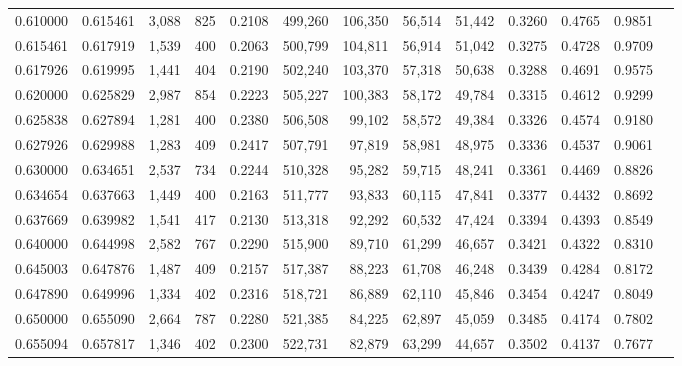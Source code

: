 \begin{tabular}{rrrrrrrrrrrrr}
0.610000 & 0.615461 &  3,088 &   825 &                                     0.2108 & 499,260 & 106,350 &  56,514 &  51,442 & 0.3260 & 0.4765 & 0.9851 \\
0.615461 & 0.617919 &  1,539 &   400 &                                     0.2063 & 500,799 & 104,811 &  56,914 &  51,042 & 0.3275 & 0.4728 & 0.9709 \\
0.617926 & 0.619995 &  1,441 &   404 &                                     0.2190 & 502,240 & 103,370 &  57,318 &  50,638 & 0.3288 & 0.4691 & 0.9575 \\
0.620000 & 0.625829 &  2,987 &   854 &                                     0.2223 & 505,227 & 100,383 &  58,172 &  49,784 & 0.3315 & 0.4612 & 0.9299 \\
0.625838 & 0.627894 &  1,281 &   400 &                                     0.2380 & 506,508 &  99,102 &  58,572 &  49,384 & 0.3326 & 0.4574 & 0.9180 \\
0.627926 & 0.629988 &  1,283 &   409 &                                     0.2417 & 507,791 &  97,819 &  58,981 &  48,975 & 0.3336 & 0.4537 & 0.9061 \\
0.630000 & 0.634651 &  2,537 &   734 &                                     0.2244 & 510,328 &  95,282 &  59,715 &  48,241 & 0.3361 & 0.4469 & 0.8826 \\
0.634654 & 0.637663 &  1,449 &   400 &                                     0.2163 & 511,777 &  93,833 &  60,115 &  47,841 & 0.3377 & 0.4432 & 0.8692 \\
0.637669 & 0.639982 &  1,541 &   417 &                                     0.2130 & 513,318 &  92,292 &  60,532 &  47,424 & 0.3394 & 0.4393 & 0.8549 \\
0.640000 & 0.644998 &  2,582 &   767 &                                     0.2290 & 515,900 &  89,710 &  61,299 &  46,657 & 0.3421 & 0.4322 & 0.8310 \\
0.645003 & 0.647876 &  1,487 &   409 &                                     0.2157 & 517,387 &  88,223 &  61,708 &  46,248 & 0.3439 & 0.4284 & 0.8172 \\
0.647890 & 0.649996 &  1,334 &   402 &                                     0.2316 & 518,721 &  86,889 &  62,110 &  45,846 & 0.3454 & 0.4247 & 0.8049 \\
0.650000 & 0.655090 &  2,664 &   787 &                                     0.2280 & 521,385 &  84,225 &  62,897 &  45,059 & 0.3485 & 0.4174 & 0.7802 \\
0.655094 & 0.657817 &  1,346 &   402 &                                     0.2300 & 522,731 &  82,879 &  63,299 &  44,657 & 0.3502 & 0.4137 & 0.7677 \\

\end{tabular}
